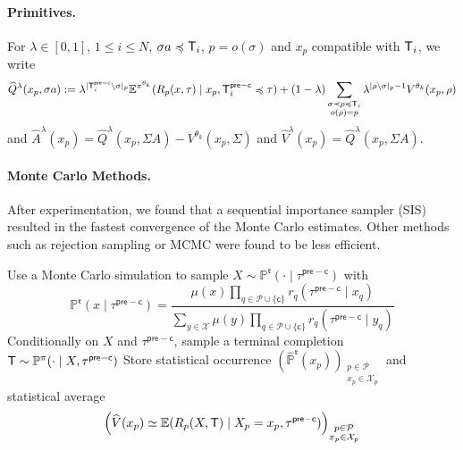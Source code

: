 \documentclass[12pt, a4paper]{article}
\begin{document}
\paragraph{Primitives.}
For $\lambda \in [0,1]$, $1 \leq i \leq N$, $\sigma a \preccurlyeq \mathsf{T}_i$, $p = o(\sigma)$ and $x_p$ compatible with $\mathsf{T}_i$, we write
\begin{equation}\label{eq:rao-blackwell-lambda-return}
  \widehat{Q}^\lambda(x_p, \sigma a)
  :=
  \lambda^{|\mathsf{T}_i^{\mathsf{pre-c}} \setminus \sigma|_p} \mathbb{E}^{\pi^{\theta_k}}(R_{p}(x, \tau) \mid x_p, \mathsf{T}_i^{\mathsf{pre-c}} \preccurlyeq \tau)
  + (1 - \lambda) \sum_{\substack{\sigma \prec \rho \preccurlyeq \mathsf{T}_i \\ o(\rho) = p}}
  \lambda^{|\rho \setminus \sigma|_p - 1} V^{\theta_k}(x_p,\rho)
\end{equation}
and $\widehat{A}^\lambda(x_p) = \widehat{Q}^\lambda(x_p,\Sigma A) - V^{\theta_k}(x_p,\Sigma)$
and $\widehat{V}^\lambda(x_p) = \widehat{Q}^\lambda(x_p,\Sigma A)$.

\paragraph{Monte Carlo Methods.}
After experimentation, we found that a sequential importance sampler (SIS) resulted in the fastest convergence of the Monte Carlo estimates.
Other methods such as rejection sampling or MCMC were found to be less efficient.

\begin{algorithm}[H]
\caption{$(\widehat{\mathbb P}^{\mathfrak r},\widehat V)\gets$~\texttt{PreTerminalMC}$(\mathfrak r,\tau^{\mathsf{pre-c}})$}
\label{alg:mc-preterminal}
\DontPrintSemicolon
{}
  Use a Monte Carlo simulation to sample $X \sim \mathbb{P}^\mathfrak{r}(\cdot\mid\tau^{\mathsf{pre-c}})$ with
  \[
    \mathbb{P}^\mathfrak{r}(x\mid\tau^{\mathsf{pre-c}})
    = \frac{\mu(x)\prod_{q \in \mathcal P \cup \{\mathsf c\}} r_q(\tau^{\mathsf{pre-c}} \mid x_q)}
           {\sum_{y\in\mathcal X} \mu(y)\prod_{q \in \mathcal P \cup \{\mathsf c\}} r_q(\tau^{\mathsf{pre-c}} \mid y_q)}
  \]\;
  Conditionally on $X$ and $\tau^{\mathsf{pre-c}}$, sample a terminal completion
  $\mathsf{T}\sim\mathbb P^\pi(\cdot\mid X,\tau^{\mathsf{pre-c}})$\;
  Store statistical occurrence $(\widehat{\mathbb P}^{\mathfrak r}(x_p))_{\substack{p \in \mathcal{P} \\ x_p \in \mathcal{X}_p}}$ and statistical average
  \[
    \left(\widehat{V}(x_p) \simeq \mathbb{E}(R_p(X,\mathsf{T}) \mid X_p = x_p,\tau^{\mathsf{pre-c}})\right)_{\substack{p \in \mathcal{P} \\ x_p \in \mathcal{X}_p}}
  \]
\end{algorithm}
\end{document}
